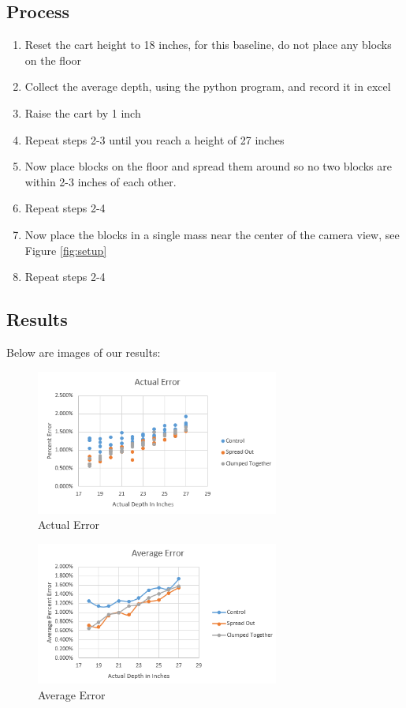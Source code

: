 \documentclass{article}
\begin{document}
				
		\newpage
		\subsection{Process}
			\begin{enumerate}
				\item Reset the cart height to 18 inches, for this baseline, do not place any blocks on the floor
				\item Collect the average depth, using the python program, and record it in excel
				\item Raise the cart by 1 inch
				\item Repeat steps 2-3 until you reach a height of 27 inches
				\item Now place blocks on the floor and spread them around so no two blocks are within 2-3 inches of each other.
				\item Repeat steps 2-4
				\item Now place the blocks in a single mass near the center of the camera view, see Figure \ref{fig:setup}
				\item Repeat steps 2-4
			\end{enumerate}
	
		\newpage
		\subsection{Results}
			Below are images of our results:
			
			\begin{figure}[h]
				\includegraphics[width=8cm]{./images/part_1/actual_error.png}
				\centering
				\caption{Actual Error}
				\label{fig:p1_results_err_actual}
			\end{figure}
		
			\begin{figure}[h]
				\includegraphics[width=8cm]{./images/part_1/average_error.png}
				\centering
				\caption{Average Error}
				\label{fig:p1_results_err_average}
			\end{figure}
		
\end{document}

